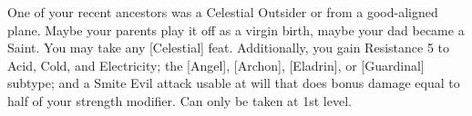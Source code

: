 \shortfeatspl
{One of your recent ancestors was a Celestial Outsider or from a good-aligned plane. Maybe your parents play it off as a virgin birth, maybe your dad became a Saint.}
{You may take any [Celestial] feat. Additionally, you gain Resistance 5 to Acid, Cold, and  Electricity; the [Angel], [Archon], [Eladrin], or [Guardinal] subtype; and a Smite Evil attack usable at will that does bonus damage equal to half of your strength modifier.}
{Can only be taken at 1st level.}